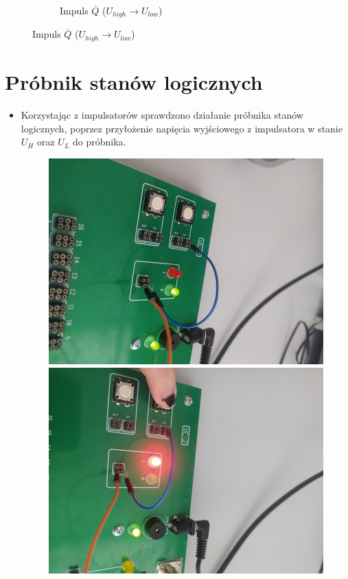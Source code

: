 \begin{itemize}
\begin{figure}[H]
\begin{subfigure}[h]{0.45\textwidth}
                    \caption*{Impuls $\overline{Q}$ ($U_{high} \xrightarrow{} U_{low}$)}
                \end{subfigure}
            \label{płytka:pomiar_impulsatorów_oscyloskop}
        \end{figure}
\end{itemize}

\section{Próbnik stanów logicznych}

\begin{itemize}
    \item Korzystając z impulsatorów sprawdzono działanie próbnika stanów logicznych, poprzez przyłożenie napięcia wyjściowego z impulsatora w stanie $U_H$ oraz $U_L$ do próbnika.
        \begin{figure}[H]
            \centering
            \includegraphics[scale=0.25]{img/test_plytka/1652306733003_scaled.png}
            \includegraphics[scale=0.25]{img/test_plytka/1652306732975_scaled.png}

\end{figure}
\end{itemize}
